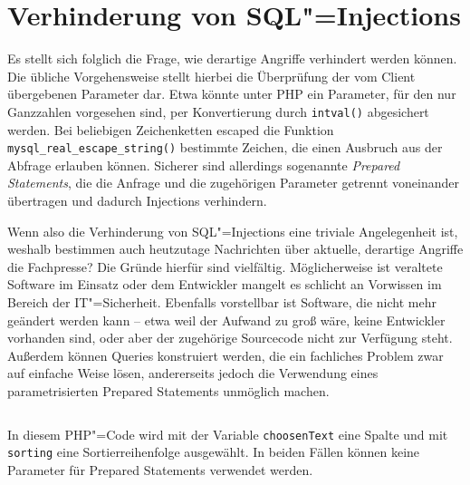 \section{Verhinderung von SQL"=Injections}

Es stellt sich folglich die Frage, wie derartige Angriffe verhindert werden können. Die übliche Vorgehensweise stellt hierbei die Überprüfung der vom Client übergebenen Parameter dar. Etwa könnte unter PHP ein Parameter, für den nur Ganzzahlen vorgesehen sind, per Konvertierung durch \texttt{intval()} abgesichert werden. Bei beliebigen Zeichenketten escaped die Funktion \texttt{mysql_real_escape_string()} bestimmte Zeichen, die einen Ausbruch aus der Abfrage erlauben können. Sicherer sind allerdings sogenannte \emph{Prepared Statements}, die die Anfrage und die zugehörigen Parameter getrennt voneinander übertragen und dadurch Injections verhindern.

Wenn also die Verhinderung von SQL"=Injections eine triviale Angelegenheit ist, weshalb bestimmen auch heutzutage Nachrichten über aktuelle, derartige Angriffe die Fachpresse? Die Gründe hierfür sind vielfältig. Möglicherweise ist veraltete Software im Einsatz oder dem Entwickler mangelt es schlicht an Vorwissen im Bereich der IT"=Sicherheit.  Ebenfalls vorstellbar ist Software, die nicht mehr geändert werden kann -- etwa weil der Aufwand zu groß wäre, keine Entwickler vorhanden sind, oder aber der zugehörige Sourcecode nicht zur Verfügung steht. Außerdem können Queries konstruiert werden, die ein fachliches Problem zwar auf einfache Weise lösen, andererseits jedoch die Verwendung eines parametrisierten Prepared Statements unmöglich machen.

\begin{listing}
\begin{margincap}
\inputminted[startinline,obeytabs]{php}{imports/weak_features.php}
\caption{In diesem PHP"=Code wird mit der Variable \texttt{choosenText} eine Spalte und mit \texttt{sorting} eine Sortierreihenfolge ausgewählt. In beiden Fällen können keine Parameter für Prepared Statements verwendet werden.}
\label{lst:strange_query}
\end{margincap}
\end{listing}

